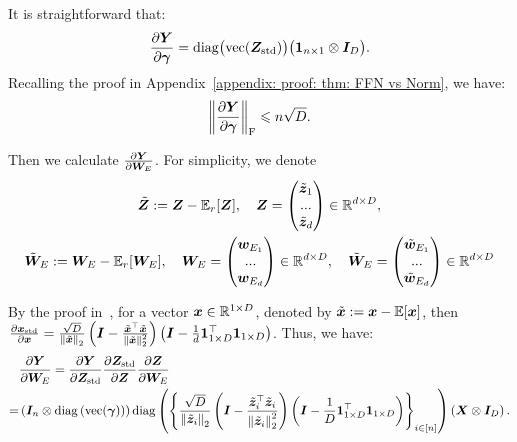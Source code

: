 It is straightforward that:
\begin{align*}
    \frac{\partial\boldsymbol{Y}}{\partial\bm{\gamma}}={\rm diag}\big({\rm vec}(\boldsymbol{Z}_{\rm std})\big)\big(\mathbf{1}_{n\times 1}\otimes \boldsymbol{I}_{D}\big).
\end{align*}
Recalling the proof in Appendix~\ref{appendix: proof: thm: FFN vs Norm}, we have:
\begin{align*}
    \left\| \frac{\partial\boldsymbol{Y}}{\partial\bm{\gamma}} \right\|_{\textnormal{F}}
    \leqslant n\sqrt{D}.
\end{align*}

Then we calculate $\frac{\partial\boldsymbol{Y}}{\partial\boldsymbol{W}_E}$. For simplicity, we denote 
\begin{gather*}
    \tilde{\boldsymbol{Z}}:=\boldsymbol{Z}-\mathbb{E}_{r}[\boldsymbol{Z}],\quad \boldsymbol{Z}=\begin{pmatrix}
    \tilde{\boldsymbol{z}}_1 \\ ... \\ \tilde{\boldsymbol{z}}_d
\end{pmatrix}\in\mathbb{R}^{d\times D},\\
\tilde{\boldsymbol{W}}_E:=\boldsymbol{W}_E-\mathbb{E}_{r}[\boldsymbol{W}_E],\quad
\boldsymbol{W}_E=\begin{pmatrix}
    \boldsymbol{w}_{E_1} \\ ... \\ \boldsymbol{w}_{E_d}
\end{pmatrix}\in\mathbb{R}^{d\times D},\quad
\tilde{\boldsymbol{W}}_E=\begin{pmatrix}
    \tilde{\boldsymbol{w}}_{E_1} \\ ... \\ \tilde{\boldsymbol{w}}_{E_d}
\end{pmatrix}\in\mathbb{R}^{d\times D}
\end{gather*} 

By the proof in~\cite{xiong2020layer}, for a vector $\boldsymbol{x}\in\mathbb{R}^{1\times D}$, denoted by $\tilde{\boldsymbol{x}}:=\boldsymbol{x}-\mathbb{E}[\boldsymbol{x}]$, then $\frac{\partial \boldsymbol{x}_{\rm std}}{\partial \boldsymbol{x}}=\frac{\sqrt{D}}{\left\| \tilde{\boldsymbol{x}} \right\|_2}\left(\boldsymbol{I}-\frac{\tilde{\boldsymbol{x}}^\top\tilde{\boldsymbol{x}}}{\left\| \tilde{\boldsymbol{x}} \right\|_2^2}\right)\left(\boldsymbol{I}-\frac{1}{d}\mathbf{1}_{1\times D}^\top\mathbf{1}_{1\times D}\right)$. Thus, we have:
\begin{align*}
    &\frac{\partial\boldsymbol{Y}}{\partial\boldsymbol{W}_E}=\frac{\partial\boldsymbol{Y}
    }{\partial \boldsymbol{Z}_{\rm std}}\frac{\partial \boldsymbol{Z}_{\rm std}}{\partial\boldsymbol{Z}}\frac{\partial \boldsymbol{Z}}{\partial\boldsymbol{W}_E}
    \\=&\left(\boldsymbol{I}_n\otimes{\rm diag}\left({\rm vec}(\bm{\gamma})\right)\right){\rm diag}\left(\left\{\frac{\sqrt{D}}{\left\| \tilde{\boldsymbol{z}}_{i} \right\|_2}\left(\boldsymbol{I}-\frac{\tilde{\boldsymbol{z}}_{i}^\top\tilde{\boldsymbol{z}}_{i}}{\left\| \tilde{\boldsymbol{z}}_{i} \right\|_2^2}\right)\left(\boldsymbol{I}-\frac{1}{D}\mathbf{1}_{1\times D}^\top\mathbf{1}_{1\times D}\right)\right\}_{i\in[n]}\right)
    \left(\boldsymbol{X}\otimes\boldsymbol{I}_D\right).
\end{align*}

